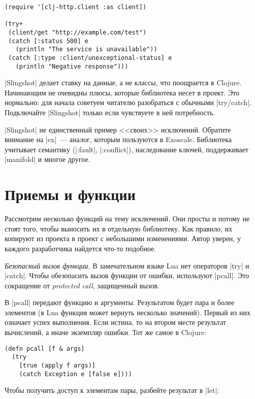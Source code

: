 \begin{verbatim}
(require '[clj-http.client :as client])

(try+
 (client/get "http://example.com/test")
 (catch [:status 500] e
   (println "The service is unavailable"))
 (catch [:type :client/unexceptional-status] e
   (println "Negative response")))
\end{verbatim}

\spverb|Slingshot| делает ставку на данные, а не классы, что поощрается в
Clojure. Начинающим не очевидны плюсы, которые библиотека несет в проект. Это
нормально: для начала советуем читателю разобраться с обычными
\spverb|try/catch|. Подключайте \spverb|Slingshot| только если чувствуете в ней
потребность.

\spverb|Slingshot| не единственный пример <<своих>> исключений. Обратите
внимание на \spverb|ex|~--- аналог, которым
пользуются в Exoscale. Библиотека учитывает семантику (\spverb|:fault|,
\spverb|:conflict|), наследование ключей, поддерживает \spverb|manifold| и
многое другое.

\section{Приемы и функции}

Рассмотрим несколько функций на тему исключений. Они просты и потому не стоят
того, чтобы выносить их в отдельную библиотеку. Как правило, их копируют из
проекта в проект с небольшими изменениями. Автор уверен, у каждого разработчика
найдется что-то подобное.

\emph{Безопасный вызов функции.} В замечательном языке Lua нет операторов
\spverb|try| и \spverb|catch|. Чтобы обезопасить вызов функции от ошибки,
используют \spverb|pcall|. Это
сокращение от \emph{protected call}, защищенный вызов.

В \spverb|pcall| передают функцию и аргументы. Результатом будет пара и более
элементов (в Lua функция может вернуть несколько значений). Первый из них
означает успех выполнения. Если истина, то на втором месте результат вычислений,
а иначе экземпляр ошибки. Тот же самое в Clojure:

\begin{verbatim}
(defn pcall [f & args]
  (try
    [true (apply f args)]
    (catch Exception e [false e])))
\end{verbatim}

Чтобы получить доступ к элементам пары, разбейте результат в \spverb|let|:

